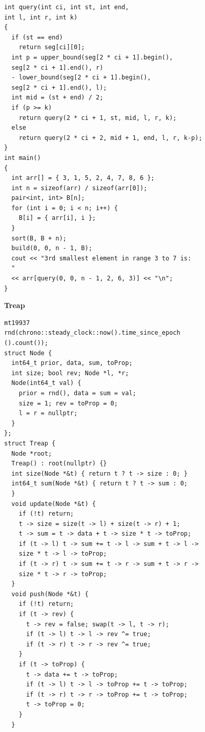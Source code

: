 \begin{lstlisting}
int query(int ci, int st, int end,
int l, int r, int k)
{
  if (st == end)
    return seg[ci][0];
  int p = upper_bound(seg[2 * ci + 1].begin(),
  seg[2 * ci + 1].end(), r)
  - lower_bound(seg[2 * ci + 1].begin(),
  seg[2 * ci + 1].end(), l);
  int mid = (st + end) / 2;
  if (p >= k)
    return query(2 * ci + 1, st, mid, l, r, k);
  else
    return query(2 * ci + 2, mid + 1, end, l, r, k-p);
}
int main()
{
  int arr[] = { 3, 1, 5, 2, 4, 7, 8, 6 };
  int n = sizeof(arr) / sizeof(arr[0]);
  pair<int, int> B[n];
  for (int i = 0; i < n; i++) {
    B[i] = { arr[i], i };
  }
  sort(B, B + n);
  build(0, 0, n - 1, B);
  cout << "3rd smallest element in range 3 to 7 is:
  "
  << arr[query(0, 0, n - 1, 2, 6, 3)] << "\n";
}
\end{lstlisting}

\textbf{Treap}
\begin{lstlisting}
mt19937
rnd(chrono::steady_clock::now().time_since_epoch
().count());
struct Node {
  int64_t prior, data, sum, toProp;
  int size; bool rev; Node *l, *r;
  Node(int64_t val) {
    prior = rnd(), data = sum = val;
    size = 1; rev = toProp = 0;
    l = r = nullptr;
  }
};
struct Treap {
  Node *root;
  Treap() : root(nullptr) {}
  int size(Node *&t) { return t ? t -> size : 0; }
  int64_t sum(Node *&t) { return t ? t -> sum : 0;
  }
  void update(Node *&t) {
    if (!t) return;
    t -> size = size(t -> l) + size(t -> r) + 1;
    t -> sum = t -> data + t -> size * t -> toProp;
    if (t -> l) t -> sum += t -> l -> sum + t -> l ->
    size * t -> l -> toProp;
    if (t -> r) t -> sum += t -> r -> sum + t -> r ->
    size * t -> r -> toProp;
  }
  void push(Node *&t) {
    if (!t) return;
    if (t -> rev) {
      t -> rev = false; swap(t -> l, t -> r);
      if (t -> l) t -> l -> rev ^= true;
      if (t -> r) t -> r -> rev ^= true;
    }
    if (t -> toProp) {
      t -> data += t -> toProp;
      if (t -> l) t -> l -> toProp += t -> toProp;
      if (t -> r) t -> r -> toProp += t -> toProp;
      t -> toProp = 0;
    }
  }
\end{lstlisting}
